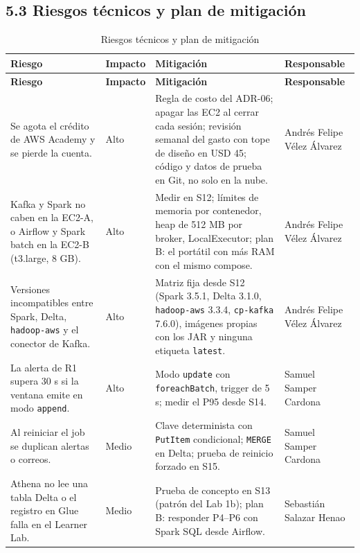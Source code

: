 \documentclass[12pt,letterpaper]{article}
\newcommand{\code}[1]{{\small\texttt{#1}}}
\begin{document}
\subsection*{5.3 Riesgos técnicos y plan de mitigación}

\begin{footnotesize}
\setlength{\LTpre}{4pt}\setlength{\LTleft}{0pt}\setlength{\LTpost}{2pt}
\setlength{\tabcolsep}{4pt}
\begin{longtable}{@{}P{1.95in}P{0.5in}P{2.85in}P{1.05in}@{}}
\caption{Riesgos técnicos y plan de mitigación}\\
\toprule
\textbf{Riesgo} & \textbf{Impacto} & \textbf{Mitigación} & \textbf{Responsable}\\
\midrule
\endfirsthead
\toprule
\textbf{Riesgo} & \textbf{Impacto} & \textbf{Mitigación} & \textbf{Responsable}\\
\midrule
\endhead
\bottomrule
\endlastfoot
Se agota el crédito de AWS Academy y se pierde la cuenta. & Alto & Regla de costo del ADR-06; apagar las EC2 al cerrar cada sesión; revisión semanal del gasto con tope de diseño en USD 45; código y datos de prueba en Git, no solo en la nube. & Andrés Felipe Vélez Álvarez\\[1pt]
Kafka y Spark no caben en la EC2-A, o Airflow y Spark batch en la EC2-B (t3.large, 8 GB). & Alto & Medir en S12; límites de memoria por contenedor, heap de 512 MB por broker, LocalExecutor; plan B: el portátil con más RAM con el mismo compose. & Andrés Felipe Vélez Álvarez\\[1pt]
Versiones incompatibles entre Spark, Delta, \code{hadoop-aws} y el conector de Kafka. & Alto & Matriz fija desde S12 (Spark 3.5.1, Delta 3.1.0, \code{hadoop-aws} 3.3.4, \code{cp-kafka} 7.6.0), imágenes propias con los JAR y ninguna etiqueta \code{latest}. & Andrés Felipe Vélez Álvarez\\[1pt]
La alerta de R1 supera 30 s si la ventana emite en modo \code{append}. & Alto & Modo \code{update} con \code{foreachBatch}, trigger de 5 s; medir el P95 desde S14. & Samuel Samper Cardona\\[1pt]
Al reiniciar el job se duplican alertas o correos. & Medio & Clave determinista con \code{PutItem} condicional; \code{MERGE} en Delta; prueba de reinicio forzado en S15. & Samuel Samper Cardona\\[1pt]
Athena no lee una tabla Delta o el registro en Glue falla en el Learner Lab. & Medio & Prueba de concepto en S13 (patrón del Lab 1b); plan B: responder P4--P6 con Spark SQL desde Airflow. & Sebastián Salazar Henao\\[1pt]

\end{longtable}
\end{footnotesize}
\end{document}
